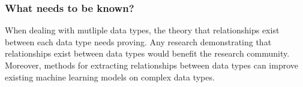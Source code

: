 \subsubsection{What needs to be known?}

When dealing with mutliple data types, the theory that relationships exist between each data type needs proving.  Any research demonstrating that relationships exist between data types would benefit the research community.  Moreover, methods for extracting relationships between data types can improve existing machine learning models on complex data types.  

